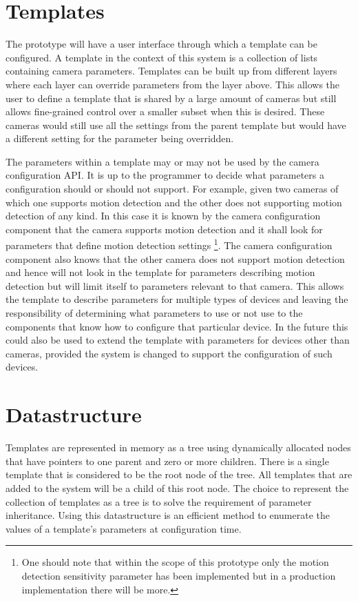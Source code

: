 \section{Templates}
The prototype will have a user interface through which a template can be configured.
A template in the context of this system is a collection of lists containing camera parameters.
Templates can be built up from different layers where each layer can override parameters from the layer above.
This allows the user to define a template that is shared by a large amount of cameras but still allows fine-grained control over a smaller subset when this is desired.
These cameras would still use all the settings from the parent template but would have a different setting for the parameter being overridden.


The parameters within a template may or may not be used by the camera configuration API.
It is up to the programmer to decide what parameters a configuration should or should not support.
For example, given two cameras of which one supports motion detection and the other does not supporting motion detection of any kind.
In this case it is known by the camera configuration component that the camera supports motion detection and it shall look for parameters that define motion detection settings
\footnote{One should note that within the scope of this prototype only the motion detection sensitivity parameter has been implemented but in a production implementation there will be more.}.
The camera configuration component also knows that the other camera does not support motion detection and hence will not look in the template for parameters describing motion detection but will limit itself to parameters relevant to that camera.
This allows the template to describe parameters for multiple types of devices and leaving the responsibility of determining what parameters to use or not use to the components that know how to configure that particular device.
In the future this could also be used to extend the template with parameters for devices other than cameras, provided the system is changed to support the configuration of such devices.

\section{Datastructure}
Templates are represented in memory as a tree using dynamically allocated nodes that have pointers to one parent and zero or more children.
There is a single template that is considered to be the root node of the tree.
All templates that are added to the system will be a child of this root node.
The choice to represent the collection of templates as a tree is to solve the requirement of parameter inheritance.
Using this datastructure is an efficient method to enumerate the values of a template's parameters at configuration time.

